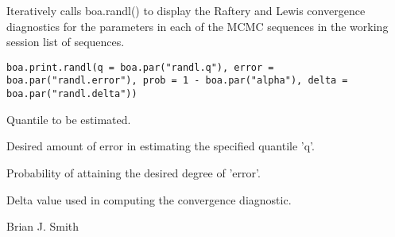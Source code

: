\begin{Description}\relax
Iteratively calls boa.randl() to display the Raftery and Lewis convergence 
diagnostics for the parameters in each of the MCMC sequences in the working 
session list of sequences.
\end{Description}
\begin{Usage}
\begin{verbatim}
boa.print.randl(q = boa.par("randl.q"), error = boa.par("randl.error"), prob = 1 - boa.par("alpha"), delta = boa.par("randl.delta"))
\end{verbatim}
\end{Usage}
\begin{Arguments}
\begin{ldescription}
\item[\code{q}] Quantile to be estimated.
\item[\code{error}] Desired amount of error in estimating the specified quantile 'q'.
\item[\code{prob}] Probability of attaining the desired degree of 'error'.
\item[\code{delta}] Delta value used in computing the convergence diagnostic.
\end{ldescription}
\end{Arguments}
\begin{Author}\relax
Brian J. Smith
\end{Author}
\begin{SeeAlso}\relax
{}
\end{SeeAlso}

